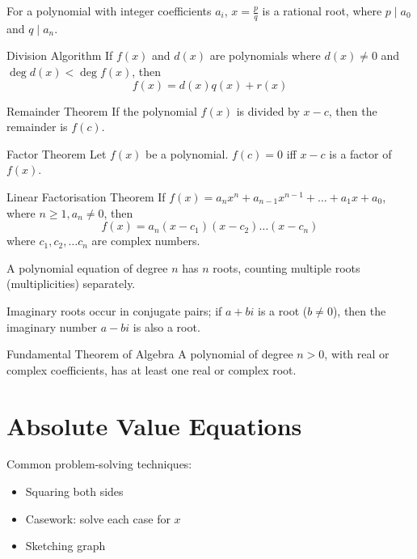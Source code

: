 For a polynomial with integer coefficients $a_i$, $x=\frac{p}{q}$ is a rational root, where $p \mid a_0$ and $q \mid a_n$.

\begin{thrm}{Division Algorithm}{}
If $f(x)$ and $d(x)$ are polynomials where $d(x) \neq 0$ and $\deg d(x)<\deg f(x)$, then
\begin{equation} f(x) = d(x) q(x) + r(x) \end{equation}
\end{thrm}

\begin{thrm}{Remainder Theorem}{} 
If the polynomial $f(x)$ is divided by $x-c$, then the remainder is $f(c)$. 
\end{thrm}

\begin{thrm}{Factor Theorem}{} 
Let $f(x)$ be a polynomial. $f(c)=0$ iff $x-c$ is a factor of $f(x)$.
\end{thrm}

\begin{thrm}{Linear Factorisation Theorem}{}
If $f(x) = a_n x^n + a_{n-1} x^{n-1} + \dots + a_1 x + a_0$, where $n \ge 1, a_n \neq 0$, then
\[ f(x) = a_n (x-c_1)(x-c_2) \dots (x-c_n) \]
where $c_1, c_2, \dots c_n$ are complex numbers. 
\end{thrm}

A polynomial equation of degree $n$ has $n$ roots, counting multiple roots (multiplicities) separately.

Imaginary roots occur in conjugate pairs; if $a + bi$ is a root ($b \neq 0$), then the imaginary number $a-bi$ is also a root.

\begin{thrm}{Fundamental Theorem of Algebra}{}
A polynomial of degree $n>0$, with real or complex coefficients, has at least one real or complex root.
\end{thrm}
\pagebreak

\section{Absolute Value Equations}
Common problem-solving techniques:
\begin{itemize}
    \item Squaring both sides
    \item Casework: solve each case for $x$
    \item Sketching graph
\end{itemize}

